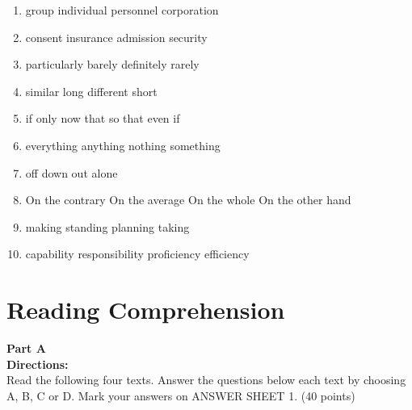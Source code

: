 \begin{enumerate}
\item

\fourchoices
{group}
{individual}
{personnel}
{corporation}



\item


\fourchoices
{consent}
{insurance}
{admission}
{security}




\item

\fourchoices
{particularly}
{barely}
{definitely}
{rarely}



\item


\fourchoices
{similar}
{long}
{different}
{short}




\item


\fourchoices
{if only}
{now that}
{so that}
{even if}




\item

\fourchoices
{everything}
{anything}
{nothing}
{something}


\item


\fourchoices
{off}
{down}
{out}
{alone}




\item

\fourchoices
{On the contrary}
{On the average}
{On the whole}
{On the other hand}


\item


\fourchoices
{making}
{standing}
{planning}
{taking}




\item

\fourchoices
{capability}
{responsibility}
{proficiency}
{efficiency}

\end{enumerate}



\section{Reading Comprehension}

\noindent
\textbf{Part A}\\
\textbf{Directions:}\\
Read the following four texts. Answer the questions below each
	text by choosing A, B, C or
	D. Mark your answers
	on ANSWER SHEET 1. (40 points)

